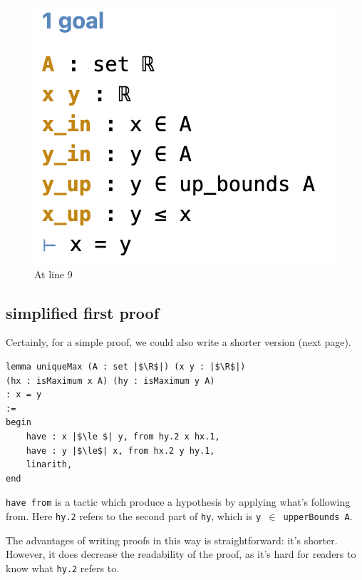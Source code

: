 \documentclass[a4paper]{article}
\newcommand{\R}{\mathbb{R}}
\theoremstyle{bfnote} %
\theoremstyle{bfnote}                  %
\theoremstyle{example}                       %
\theoremstyle{remark}                       %
\numberwithin{equation}{section}
\begin{document}
\begin{figure}[!htb]
  \includegraphics[width=\linewidth]{line9.png}
  \caption{At line 9}\label{fig:awesome_image3}
\endminipage
\end{figure}

\subsection{simplified first proof}
Certainly, for a simple proof, we could also write a shorter version (next page).

\begin{listing}[!ht]
\begin{verbatim}
lemma uniqueMax (A : set |$\R$|) (x y : |$\R$|) 
(hx : isMaximum x A) (hy : isMaximum y A) 
: x = y 
:= 
begin
	have : x |$\le $| y, from hy.2 x hx.1,
	have : y |$\le$| x, from hx.2 y hy.1,
	linarith,
end
\end{verbatim}
	
\end{listing}

\texttt{have from} is a tactic which produce a hypothesis by applying what's following from. Here  \texttt{hy.2} refers to the second part of  \texttt{hy}, which is \texttt{y $\in$ upperBounds A}.

The advantages of writing proofs in this way is straightforward: it's shorter. However, it does decrease the readability of the proof, as it's hard for readers to know what  \texttt{hy.2} refers to. 
\end{document}
